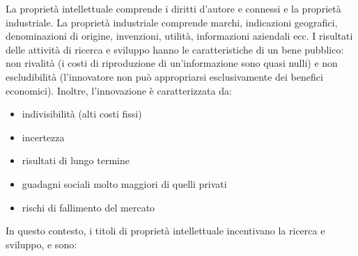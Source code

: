 \documentclass[answers, a4paper, 11pt]{exam}
\begin{document}
La proprietà intellettuale comprende i diritti d'autore e connessi e la proprietà industriale.
La proprietà industriale comprende marchi, indicazioni geografici, denominazioni di origine, invenzioni, utilità, informazioni aziendali ecc. 
I risultati delle attività di ricerca e sviluppo hanno le caratteristiche di un bene pubblico: non rivalità (i costi di riproduzione di un'informazione sono quasi nulli) e non escludibilità (l'innovatore non può appropriarsi esclusivamente dei benefici economici).
Inoltre, l'innovazione è caratterizzata da:

\begin{itemize}
    \item indivisibilità (alti costi fissi)
    \item incertezza
    \item risultati di lungo termine
    \item guadagni sociali molto maggiori di quelli privati
    \item rischi di fallimento del mercato
\end{itemize}

In questo contesto, i titoli di proprietà intellettuale incentivano la ricerca e sviluppo, e sono:
\end{document}
